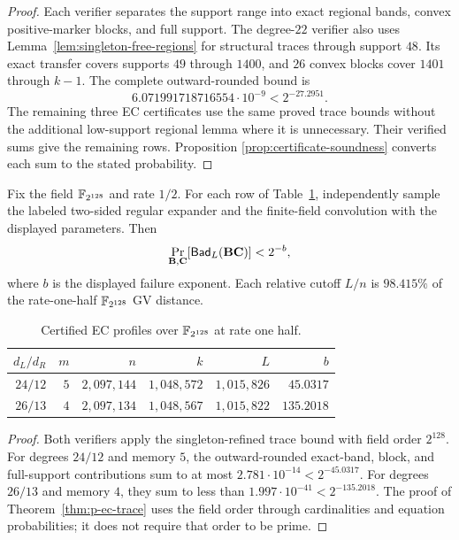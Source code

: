 \begin{proof}
Each verifier separates the support range into exact regional bands, convex
positive-marker blocks, and full support.  The degree-$22$ verifier also uses
Lemma~\ref{lem:singleton-free-regions} for structural traces through support
$48$.  Its exact transfer covers supports $49$ through $1400$, and $26$
convex blocks cover $1401$ through $k-1$.  The complete outward-rounded bound
is
\[
 6.071991718716554\cdot10^{-9}<2^{-27.2951}.
\]
The remaining three EC certificates use the same proved trace bounds without the
additional low-support regional lemma where it is unnecessary.  Their
verified sums give the remaining rows.  Proposition
\ref{prop:certificate-soundness} converts each sum to the stated probability.
\end{proof}

\begin{theorem}
\label{thm:gf128-ec-certificate}
Fix the field $\mathbb F_{2^{128}}$ and rate $1/2$.  For each row of
Table~\ref{tab:gf128-ec-certificates}, independently sample the labeled
two-sided regular expander and the finite-field convolution with the displayed
parameters.  Then
\begin{equation}
 \Pr_{\mathbf B,\mathbf C}[\mathsf{Bad}_L(\mathbf B\mathbf C)]<2^{-b},
 \label{eq:gf128-ec-certificate}
\end{equation}
where $b$ is the displayed failure exponent.  Each relative cutoff $L/n$ is
$98.415\%$ of the rate-one-half $\mathbb F_{2^{128}}$ GV distance.
\end{theorem}

\begin{table}[ht]
\centering
\caption{Certified EC profiles over $\mathbb F_{2^{128}}$ at rate one half.}
\label{tab:gf128-ec-certificates}
\begin{tabular}{@{}rrrrrr@{}}
\toprule
$d_L/d_R$ & $m$ & $n$ & $k$ & $L$ & $b$ \\
\midrule
$24/12$ & $5$ & $2{,}097{,}144$ & $1{,}048{,}572$ & $1{,}015{,}826$ & $45.0317$ \\
$26/13$ & $4$ & $2{,}097{,}134$ & $1{,}048{,}567$ & $1{,}015{,}822$ & $135.2018$ \\
\bottomrule
\end{tabular}
\end{table}

\begin{proof}
Both verifiers apply the singleton-refined trace bound with field order
$2^{128}$.  For degrees $24/12$ and memory $5$, the outward-rounded exact-band,
block, and full-support contributions sum to at most
$2.781\cdot10^{-14}<2^{-45.0317}$.  For degrees $26/13$ and memory $4$, they
sum to less than $1.997\cdot10^{-41}<2^{-135.2018}$.  The proof of
Theorem~\ref{thm:p-ec-trace} uses the field order through cardinalities and
equation probabilities; it does not require that order to be prime.
\end{proof}


